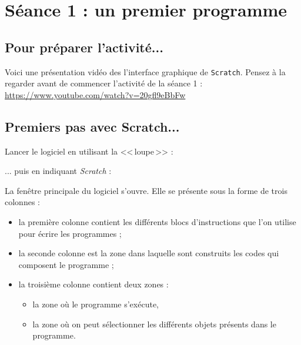 %
%
%
%

\section{Séance 1 : un premier programme}

\subsection{Pour préparer l'activité...}

Voici une présentation vidéo des l'interface graphique de \texttt{Scratch}. Pensez à la regarder avant de commencer l'activité de la séance 1 :\\

\href{https://www.youtube.com/watch?v=20gfl9eBbFw}{https://www.youtube.com/watch?v=20gfl9eBbFw}



\subsection{Premiers pas avec Scratch...}

Lancer le logiciel en utilisant la <<\,loupe\,>> :


... puis en indiquant \emph{Scratch} :



La fenêtre principale du logiciel s'ouvre. Elle se présente sous la forme de trois colonnes :

\begin{itemize}
\item la première colonne  contient les différents blocs d'instructions que l'on utilise pour écrire les programmes ;
\item la seconde colonne  est la zone dans laquelle sont construits les codes qui composent le programme ;
\item la troisième colonne  contient deux zones :
        \begin{itemize}
        \item la zone où le programme s'exécute,
        \item la zone où on peut sélectionner les différents objets présents dans le programme.
        \end{itemize}
\end{itemize}


